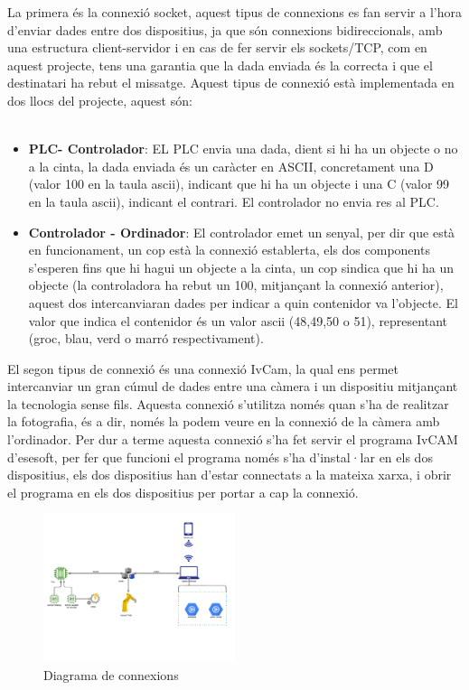 ﻿\documentclass[10pt,a4paper,twocolumn,twoside]{article}
\begin{document}
La primera és la connexió socket, aquest tipus de connexions es fan servir a l'hora d'enviar dades entre dos dispositius, ja que són connexions bidireccionals, amb una estructura client-servidor i en cas de fer servir els sockets/TCP, com en aquest projecte, tens una garantia que la dada enviada és la correcta i que el destinatari ha rebut el missatge. Aquest tipus de connexió està implementada en dos llocs del projecte, aquest són:
\\
\\
\begin{itemize}
	\item \textbf{PLC- Controlador}: EL PLC envia una dada, dient si hi ha un objecte o no a la cinta, la dada enviada és un caràcter en ASCII, concretament una D (valor 100 en la taula ascii), indicant que hi ha un objecte i una C (valor 99 en la taula ascii), indicant el contrari. El controlador no envia res al PLC.

	\item \textbf{Controlador - Ordinador}: El controlador emet un senyal, per dir que està en funcionament, un cop està la connexió establerta, els dos components s'esperen fins que hi hagui un objecte a la cinta, un cop sindica que hi ha un objecte (la controladora ha rebut un 100, mitjançant la connexió anterior), aquest dos intercanviaran dades per indicar a quin contenidor va l'objecte. El valor que indica el contenidor és un valor ascii (48,49,50 o 51), representant (groc, blau, verd o marró respectivament).
\end{itemize}

El segon tipus de connexió és una connexió IvCam, la qual ens permet intercanviar un gran cúmul de dades entre una càmera i un dispositiu mitjançant la tecnologia sense fils. Aquesta connexió s'utilitza només quan s'ha de realitzar la fotografia, és a dir, només la podem veure en la connexió de la càmera amb l'ordinador. Per dur a terme aquesta connexió s'ha fet servir el programa IvCAM d'esesoft, per fer que funcioni el programa només s'ha d'instal·lar en els dos dispositius, els dos dispositius han d'estar connectats a la mateixa xarxa, i obrir el programa en els dos dispositius per portar a cap la connexió.

 \begin{figure}[!h]
 \centering
    \includegraphics[width=0.5\textwidth]{img/connexions.png}
    \caption{Diagrama de connexions}
\end{figure}
\end{document}
